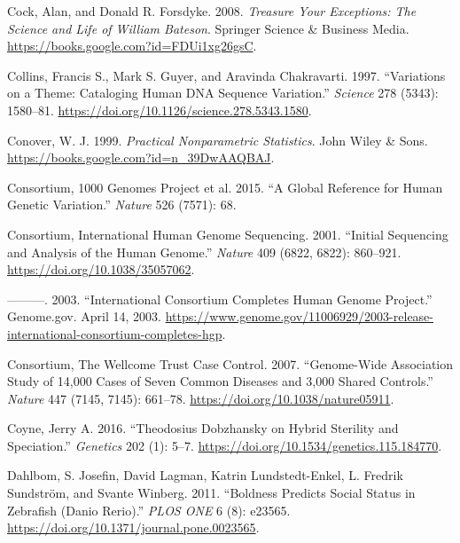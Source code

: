 \documentclass[
]{book}
\newlength{\cslhangindent}
\newlength{\cslentryspacingunit} %
\newenvironment{CSLReferences}[2] %
 {%
  \setlength{\parindent}{0pt}
  \ifodd #1
  \let\oldpar\par
  \def\par{\hangindent=\cslhangindent\oldpar}
  \fi
  \setlength{\parskip}{#2\cslentryspacingunit}
 }%
 {}
\begin{document}
\begin{CSLReferences}{1}{0}
\leavevmode{}%
Cock, Alan, and Donald R. Forsdyke. 2008. \emph{Treasure {Your Exceptions}: {The Science} and {Life} of {William Bateson}}. {Springer Science \& Business Media}. \url{https://books.google.com?id=FDUi1xg26gsC}.

\leavevmode{}%
Collins, Francis S., Mark S. Guyer, and Aravinda Chakravarti. 1997. {``Variations on a {Theme}: {Cataloging Human DNA Sequence Variation}.''} \emph{Science} 278 (5343): 1580--81. \url{https://doi.org/10.1126/science.278.5343.1580}.

\leavevmode{}%
Conover, W. J. 1999. \emph{Practical {Nonparametric Statistics}}. {John Wiley \& Sons}. \url{https://books.google.com?id=n_39DwAAQBAJ}.

\leavevmode{}%
Consortium, 1000 Genomes Project et al. 2015. {``A Global Reference for Human Genetic Variation.''} \emph{Nature} 526 (7571): 68.

\leavevmode{}%
Consortium, International Human Genome Sequencing. 2001. {``Initial Sequencing and Analysis of the Human Genome.''} \emph{Nature} 409 (6822, 6822): 860--921. \url{https://doi.org/10.1038/35057062}.

\leavevmode{}%
---------. 2003. {``International {Consortium Completes Human Genome Project}.''} {Genome.gov}. April 14, 2003. \url{https://www.genome.gov/11006929/2003-release-international-consortium-completes-hgp}.

\leavevmode{}%
Consortium, The Wellcome Trust Case Control. 2007. {``Genome-Wide Association Study of 14,000 Cases of Seven Common Diseases and 3,000 Shared Controls.''} \emph{Nature} 447 (7145, 7145): 661--78. \url{https://doi.org/10.1038/nature05911}.

\leavevmode{}%
Coyne, Jerry A. 2016. {``Theodosius {Dobzhansky} on {Hybrid Sterility} and {Speciation}.''} \emph{Genetics} 202 (1): 5--7. \url{https://doi.org/10.1534/genetics.115.184770}.

\leavevmode{}%
Dahlbom, S. Josefin, David Lagman, Katrin Lundstedt-Enkel, L. Fredrik Sundström, and Svante Winberg. 2011. {``Boldness {Predicts Social Status} in {Zebrafish} ({Danio} Rerio).''} \emph{PLOS ONE} 6 (8): e23565. \url{https://doi.org/10.1371/journal.pone.0023565}.


\end{CSLReferences}
\end{document}
